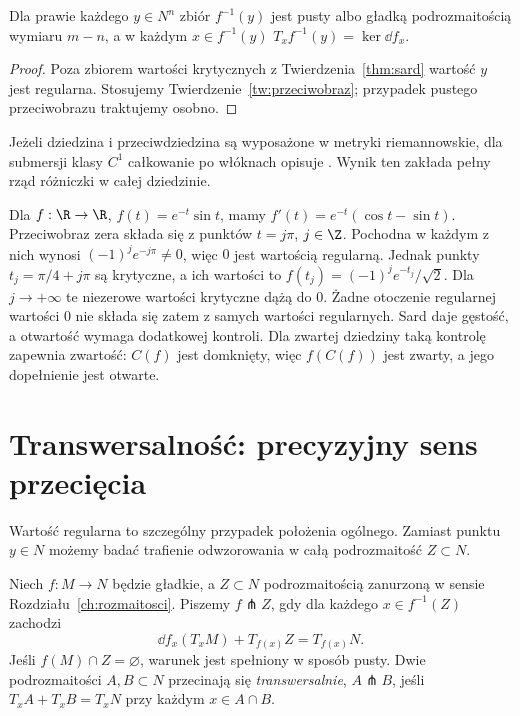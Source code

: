 \begin{wniosek}
\label{cor:sard-poziomica}
Dla prawie każdego $y\in N^n$ zbiór
$f^{-1}(y)$ jest pusty albo gładką
podrozmaitością wymiaru $m-n$, a w każdym
$x\in f^{-1}(y)$
$T_xf^{-1}(y)=\ker\dd f_x$.
\end{wniosek}
\begin{proof}
Poza zbiorem wartości krytycznych z
Twierdzenia~\ref{thm:sard} wartość $y$
jest regularna. Stosujemy
Twierdzenie~\ref{tw:przeciwobraz}; przypadek
pustego przeciwobrazu traktujemy osobno.
\end{proof}

Jeżeli dziedzina i przeciwdziedzina są wyposażone w metryki
riemannowskie, dla submersji klasy $C^1$ całkowanie po włóknach
opisuje .
Wynik ten zakłada pełny rząd różniczki w całej dziedzinie.

\begin{przyklad}
\label{prz:sard-regularne-nieotwarte-19}
Dla $f:\R\to\R$, $f(t)=e^{-t}\sin t$, mamy
$f'(t)=e^{-t}(\cos t-\sin t)$.
Przeciwobraz zera składa się z punktów $t=j\pi$, $j\in\Z$.
Pochodna w każdym z nich wynosi $(-1)^je^{-j\pi}\ne0$,
więc $0$ jest wartością regularną.
Jednak punkty $t_j=\pi/4+j\pi$ są krytyczne, a ich wartości
to $f(t_j)=(-1)^je^{-t_j}/\sqrt2$.
Dla $j\to+\infty$ te niezerowe wartości krytyczne dążą do $0$.
Żadne otoczenie regularnej wartości $0$ nie składa się zatem
z samych wartości regularnych.
Sard daje gęstość, a otwartość wymaga dodatkowej kontroli.
Dla zwartej dziedziny taką kontrolę zapewnia zwartość:
$C(f)$ jest domknięty, więc $f(C(f))$ jest zwarty,
a jego dopełnienie jest otwarte.
\end{przyklad}

\section{Transwersalność: precyzyjny sens przecięcia}
\label{sec:transwersalnosc}

Wartość regularna to szczególny przypadek
położenia ogólnego. Zamiast punktu $y\in N$
możemy badać trafienie odwzorowania w całą
podrozmaitość $Z\subset N$.

\begin{definicja}
\label{def:transwersalnosc}
Niech $f:M\to N$ będzie gładkie, a
$Z\subset N$ podrozmaitością zanurzoną w sensie
Rozdziału~\ref{ch:rozmaitosci}. Piszemy
$f\pitchfork Z$, gdy dla każdego
$x\in f^{-1}(Z)$ zachodzi
\begin{equation}\label{eq:transwersalnosc}
 \dd f_x(T_xM)+T_{f(x)}Z=T_{f(x)}N.
\end{equation}
Jeśli $f(M)\cap Z=\varnothing$, warunek jest spełniony
w sposób pusty. Dwie podrozmaitości $A,B\subset N$
przecinają się \emph{transwersalnie},
$A\pitchfork B$, jeśli
$T_xA+T_xB=T_xN$ przy każdym $x\in A\cap B$.
\end{definicja}

